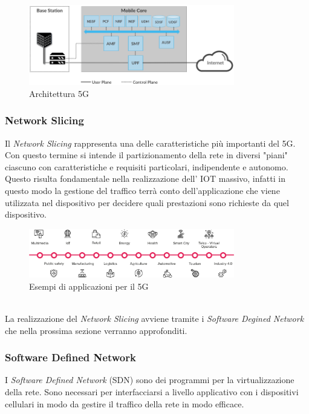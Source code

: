 \begin{figure}[ht]
    \centering
    \includegraphics[width=0.8\textwidth]{images/5g-planes.png}
    \caption{Architettura 5G\cite{5g-approach}}
\end{figure}

\clearpage

\subsubsection{Network Slicing}
Il \textit{Network Slicing} rappresenta una delle caratteristiche più importanti del 5G. Con questo termine si intende il partizionamento della
rete in diversi "piani" ciascuno con caratteristiche e requisiti particolari, indipendente e autonomo. Questo risulta fondamentale nella realizzazione 
dell' IOT massivo, infatti in questo modo la gestione del traffico terrà conto dell'applicazione che viene utilizzata nel dispositivo per decidere quali prestazioni sono 
richieste da quel dispositivo.
\begin{figure}[ht]
    \centering
    \includegraphics[width=0.8\textwidth]{images/5g-eg-of-use.png}
    \caption{Esempi di applicazioni per il 5G}
\end{figure}\\
La realizzazione del \textit{Network Slicing} avviene tramite i \textit{Software Degined Network} che nella prossima sezione verranno approfonditi.
\subsubsection{Software Defined Network}
I \textit{Software Defined Network} (SDN) sono dei programmi per la virtualizzazione della rete. Sono necessari per interfacciarsi a livello applicativo con i dispositivi cellulari 
in modo da gestire il traffico della rete in modo efficace\cite{5g-sdn}.